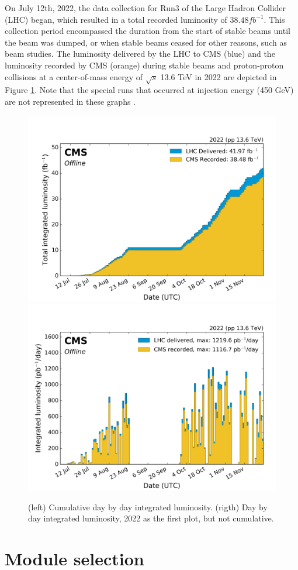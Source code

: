 On July 12th, 2022, the data collection for Run3 of the Large Hadron Collider (LHC) began, which resulted in a total recorded luminosity of $38.48 fb^{-1}$. This collection period encompassed the duration from the start of stable beams until the beam was dumped, or when stable beams ceased for other reasons, such as beam studies. The luminosity delivered by the LHC to CMS (blue) and the luminosity recorded by CMS (orange) during stable beams and proton-proton collisions at a center-of-mass energy of $\sqrt{s}$ 13.6 TeV in 2022 are depicted in Figure \ref{Lumi_2022}. Note that  the special runs that occurred at injection energy (450 GeV) are not represented in these graphs \citep{wikicern}.

\begin{center}
  \begin{figure}[h!]
    \centering
    \includegraphics[width=.45\textwidth]{Chapter3/lumi_per_day_cumulative_pp_2022.png}
    \includegraphics[width=.45\textwidth]{Chapter3/lumi_per_day_pp_2022.png}
    \caption[Integrated Luminosity 2022]{(left) Cumulative day by day integrated luminosity. (rigth) Day by day integrated luminosity, 2022 as the first plot, but not cumulative.} 
    \label{Lumi_2022}
  \end{figure}
\end{center}

\section{Module selection}


